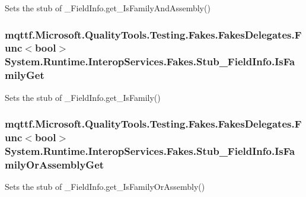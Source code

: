 Sets the stub of \-\_\-\-Field\-Info.\-get\-\_\-\-Is\-Family\-And\-Assembly()

\hypertarget{class_system_1_1_runtime_1_1_interop_services_1_1_fakes_1_1_stub___field_info_abefc1e8812519c8b3b841d6eec2994b3}{
\subsubsection[{Is\-Family\-Get}]{\setlength{\rightskip}{0pt plus 5cm}mqttf.\-Microsoft.\-Quality\-Tools.\-Testing.\-Fakes.\-Fakes\-Delegates.\-Func$<$bool$>$ System.\-Runtime.\-Interop\-Services.\-Fakes.\-Stub\-\_\-\-Field\-Info.\-Is\-Family\-Get}}\label{class_system_1_1_runtime_1_1_interop_services_1_1_fakes_1_1_stub___field_info_abefc1e8812519c8b3b841d6eec2994b3}


Sets the stub of \-\_\-\-Field\-Info.\-get\-\_\-\-Is\-Family()

\hypertarget{class_system_1_1_runtime_1_1_interop_services_1_1_fakes_1_1_stub___field_info_a86fb3e79c51159f38ae453a5091e419a}{
\subsubsection[{Is\-Family\-Or\-Assembly\-Get}]{\setlength{\rightskip}{0pt plus 5cm}mqttf.\-Microsoft.\-Quality\-Tools.\-Testing.\-Fakes.\-Fakes\-Delegates.\-Func$<$bool$>$ System.\-Runtime.\-Interop\-Services.\-Fakes.\-Stub\-\_\-\-Field\-Info.\-Is\-Family\-Or\-Assembly\-Get}}\label{class_system_1_1_runtime_1_1_interop_services_1_1_fakes_1_1_stub___field_info_a86fb3e79c51159f38ae453a5091e419a}


Sets the stub of \-\_\-\-Field\-Info.\-get\-\_\-\-Is\-Family\-Or\-Assembly()

